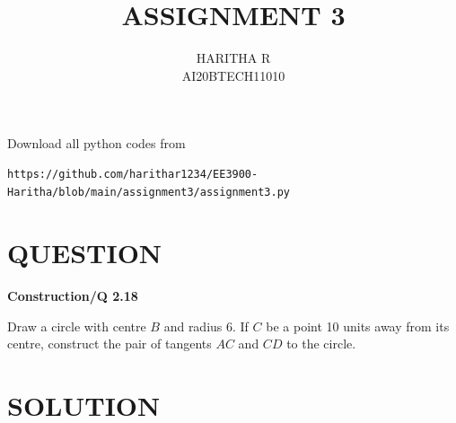 \documentclass[journal,12pt,twocolumn]{IEEEtran}
\begin{document}
\let\vec\mathbf
\renewcommand{\thefigure}{\theproblem}
\def\putbox#1#2#3{\makebox[0in][l]{\makebox[#1][l]{}\raisebox{\baselineskip}[0in][0in]{\raisebox{#2}[0in][0in]{#3}}}}
     \def\rightbox#1{\makebox[0in][r]{#1}}
     \def\centbox#1{\makebox[0in]{#1}}
     \def\topbox#1{\raisebox{-\baselineskip}[0in][0in]{#1}}
     \def\midbox#1{\raisebox{-0.5\baselineskip}[0in][0in]{#1}}
\vspace{3cm}
\title{ ASSIGNMENT 3}
\author{HARITHA R\\ AI20BTECH11010}
\maketitle
\newpage
\bigskip
\renewcommand{\thefigure}{\arabic{figure}}
\renewcommand{\thetable}{\arabic{table}}
Download all python codes from
\begin{lstlisting}
https://github.com/harithar1234/EE3900-Haritha/blob/main/assignment3/assignment3.py
\end{lstlisting}
\section*{QUESTION}
\textbf{Construction/Q 2.18}
\begin{enumerate}
Draw a circle with centre $B$ and radius 6.  If $C$ be  a point 10 units  away from its 
centre, construct the pair of tangents $AC$ and $CD$ to the 
circle.
\end{enumerate}
\section*{SOLUTION}
\end{document}
